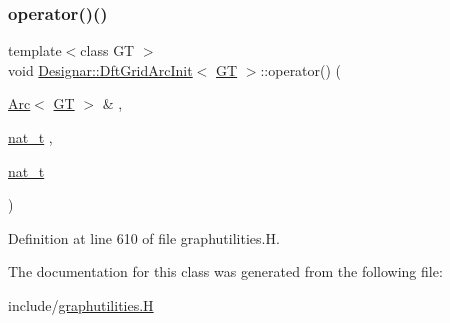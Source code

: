 \subsubsection{\texorpdfstring{operator()()}{operator()()}}
{\footnotesize\ttfamily template$<$class GT $>$ \\
void \hyperlink{class_designar_1_1_dft_grid_arc_init}{Designar\+::\+Dft\+Grid\+Arc\+Init}$<$ \hyperlink{demo-buildgraph_8_c_a3001c40d2c31ca87ed96cd7d1334a55e}{GT} $>$\+::operator() (\begin{DoxyParamCaption}\item[{\hyperlink{namespace_designar_a3f55fb5513d62ff47cbc8f72b8e95d6f}{Arc}$<$ \hyperlink{demo-buildgraph_8_c_a3001c40d2c31ca87ed96cd7d1334a55e}{GT} $>$ \&}]{,  }\item[{\hyperlink{namespace_designar_aa72662848b9f4815e7bf31a7cf3e33d1}{nat\+\_\+t}}]{,  }\item[{\hyperlink{namespace_designar_aa72662848b9f4815e7bf31a7cf3e33d1}{nat\+\_\+t}}]{ }\end{DoxyParamCaption})\hspace{0.3cm}{\ttfamily [inline]}}



Definition at line 610 of file graphutilities.\+H.



The documentation for this class was generated from the following file\+:\begin{DoxyCompactItemize}
\item 
include/\hyperlink{graphutilities_8_h}{graphutilities.\+H}\end{DoxyCompactItemize}
